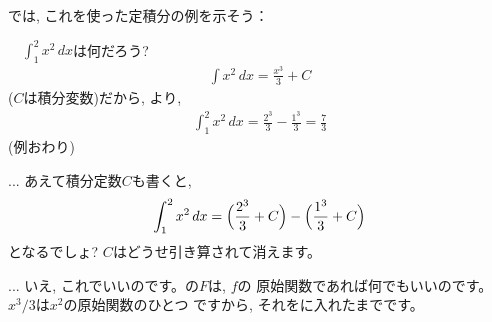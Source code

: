 では, これを使った定積分の例を示そう：
\begin{exmpl}　$\int_{1}^{2}x^2\,dx$は何だろう? 
\begin{eqnarray}
\int x^2\,dx=\frac{x^3}{3}+C
\end{eqnarray}
($C$は積分変数)だから, より, 
\begin{eqnarray}
\int_{1}^{2}x^2\,dx=\frac{2^3}{3}-\frac{1^3}{3}=\frac{7}{3}\label{eq:integralexample}
\end{eqnarray}
(例おわり)\end{exmpl}

\begin{faq}{\small{}
... あえて積分定数$C$も書くと, 
\begin{eqnarray}
\int_{1}^{2}x^2\,dx=\Bigl(\frac{2^3}{3}+C\Bigr)-\Bigl(\frac{1^3}{3}+C\Bigr)
\end{eqnarray}
となるでしょ? $C$はどうせ引き算されて消えます。

... いえ, これでいいのです。の$F$は, $f$の
原始関数であれば何でもいいのです。$x^3/3$は$x^2$の原始関数のひとつ
ですから, それをに入れたまでです。
}\end{faq}

